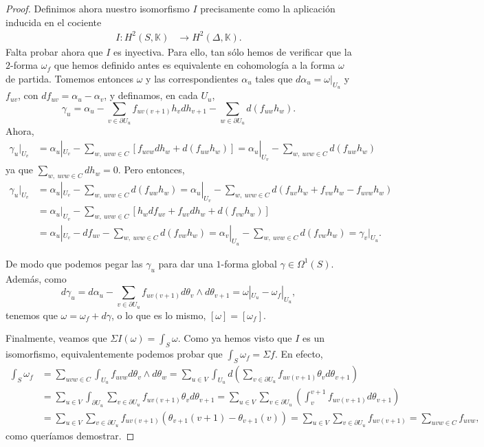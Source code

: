 \documentclass[12pt,a4paper]{article}
\theoremstyle{definition} \newtheorem{defn}[thm]{Definición}
\theoremstyle{definition} \newtheorem{ejemplo}[thm]{Ejemplo}
\theoremstyle{definition} \newtheorem{ejercicio}[thm]{Ejercicio}
\begin{document}
\begin{proof}
	Definimos ahora nuestro isomorfismo $I$ precisamente como la aplicación inducida en el cociente
	\begin{align*}
	  I :H^2(S,\mathbb{K}) &\longrightarrow H^2(\Delta, \mathbb{K}).
	  \end{align*}
	  Falta probar ahora que $I$ es inyectiva. Para ello, tan sólo hemos de verificar que la $2$-forma $\omega_f$ que hemos definido antes es equivalente en cohomología a la forma $\omega$ de partida. Tomemos entonces $\omega$ y las correspondientes $\alpha_u$ tales que $d\alpha_u = \omega |_{U_u}$ y $f_{uv}$, con $df_{uv} = \alpha_u - \alpha_v$, y definamos, en cada $U_u$,
	  \begin{equation*}
	    \gamma_u = \alpha_u - \sum_{v \in \partial U_u} f_{uv(v+1)} h_v dh_{v+1} - \sum_{w \in \partial U_u} d(f_{uw} h_w).
	  \end{equation*}
Ahora,
\begin{align*}
  \gamma_u|_{U_v} &= \alpha_u|_{U_v} - \sum_{w,\ uvw\in C} [f_{uvw} dh_w + d(f_{uw} h_w)] =\alpha_u|_{U_v} - \sum_{w,\ uvw\in C} d(f_{uw}h_w)
\end{align*}
ya que $\sum_{w, \ uvw \in C} dh_w = 0$.
Pero entonces,
\begin{align*}
  \gamma_u|_{U_v} & =\alpha_u|_{U_v} - \sum_{w,\ uvw\in C} d(f_{uw}h_w) = \alpha_u|_{U_v} - \sum_{w, \ uvw \in C} d(f_{uv}h_w + f_{vw}h_w - f_{uvw}h_w) \\
  & =\alpha_u|_{U_v} - \sum_{w, \ uvw \in C} [h_w df_{uv} + f_{uv} dh_w + d(f_{vw} h_w)] \\ & = \alpha_{u}|_{U_v} - df_{uv} - \sum_{w, \ uvw \in C}d(f_{vw} h_w) = \alpha_v|_{U_u} - \sum_{w, \ uvw \in C}d(f_{vw} h_w) = \gamma_v|_{U_u}.
\end{align*}

De modo que podemos pegar las $\gamma_u$ para dar una $1$-forma global $\gamma \in \Omega^1(S)$. Además, como
\begin{equation*}
  d\gamma_u = d \alpha_u - \sum_{v \in \partial U_u} f_{uv(v+1)} d\theta_v \wedge d\theta_{v+1} = \omega|_{U_u} - \omega_f|_{U_u},
\end{equation*}
tenemos que $\omega = \omega_f + d\gamma$, o lo que es lo mismo, $[\omega]=[\omega_f]$.
	
Finalmente, veamos que $\Sigma I(\omega) = \int_S \omega$. Como ya hemos visto que $I$ es un isomorfismo, equivalentemente podemos probar que $\int_S \omega_f = \Sigma f$. En efecto,
\begin{align*}
  \int_S \omega_f &= \sum_{uvw \in C} \int_{U_u} f_{uvw} d\theta_v \wedge d\theta_w = \sum_{u \in V} \int_{U_u} d\left( \sum_{v \in \partial U_u} f_{uv(v+1)} \theta_v d\theta_{v+1} \right) \\
  &= \sum_{u \in V} \int_{\partial U_u} \sum_{v \in \partial U_u} f_{uv(v+1)} \theta_v d\theta_{v+1} = \sum_{u \in V} \sum_{v \in \partial U_u} \left( \int_v^{v+1} f_{uv(v+1)} d\theta_{v+1} \right) \\
  &=  \sum_{u \in V} \sum_{v \in \partial U_u} f_{uv(v+1)} (\theta_{v+1}(v+1) - \theta_{v+1}(v)) = \sum_{u \in V} \sum_{v \in \partial U_u} f_{uv(v+1)} = \sum_{uvw \in C} f_{uvw},
\end{align*}
como queríamos demostrar.
    \end{proof}
  
\end{document}
